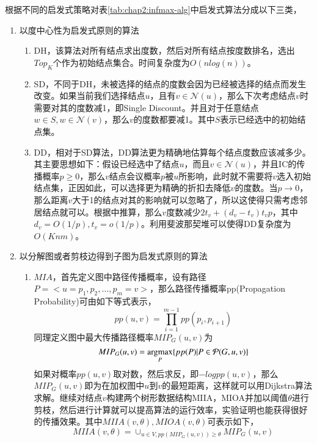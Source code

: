 根据不同的启发式策略对表\ref{tab:chap2:infmax-alg}中启发式算法分成以下三类，
\begin{enumerate}
\item 以度中心性为启发式原则的算法
\begin{enumerate}
\item DH\cite{hu2015rmdn}，该算法对所有结点求出度数，然后对所有结点按度数排名，选出$Top_{K}$个作为初始结点集合。时间复杂度为$O(nlog(n))$。
\item SD\cite{chen2009efficient}，不同于DH，未被选择的结点的度数会因为已经被选择的结点而发生改变。如果当前我们选择结点$u$，且有$v \in \mathcal{N}(u)$，那么下次考虑结点$v$时需要对其的度数减1，即Single Discount。并且对于任意结点$w \in S, w \in \mathcal{N}(v)$，那么$v$的度数都要减1。其中$S$表示已经选中的初始结点集。
\item DD\cite{chen2009efficient}，相对于SD算法，DD算法更为精确地估算每个结点度数应该减多少。其主要思想如下：假设已经选中了结点$u$，而且$v \in \mathcal{N}(u)$，并且IC的传播概率$p \geq 0$，那么$v$结点会议概率$p$被$u$所影响，此时就不需要将$v$选入初始结点集，正因如此，可以选择更为精确的折扣去降低$v$的度数。当$p \to 0$，那么距离$v$大于1的结点对其的影响就可以忽略了，所以这使得只需考虑邻居结点就可以。根据\cite{chen2009efficient}中推算，那么$v$度数减少$2t_{v} + (d_{v}-t_{v})t_{v}p$，其中$d_{v}=O(1/p), t_{v}=o(1/p)$。利用斐波那契堆可以使得DD复杂度为$O(Knm)$。
\end{enumerate}
\item 以分解图或者剪枝边得到子图为启发式原则的算法
\begin{enumerate}
\item $MIA$\cite{chen2010scalableKDD}，首先定义图中路径传播概率，设有路径$P=<u=p_{1},p_{2},\dots,p_{m}=v>$，那么路径传播概率pp(Propagation Probability)可由如下等式表示，
\begin{displaymath}pp(u,v)=\prod_{i=1}^{m-1}pp(p_{i}, p_{i+1})\end{displaymath}同理定义图中最大传播路径概率$MIP_{G}(u,v)$为
\begin{displaymath}MIP_{G}(u,v)=\mathop{\rm argmax} \limits_{P}\{pp(P)|P \in \mathcal{P}(G, u, v)\}\end{displaymath}如果对概率$pp(u,v)$取对数，然后求反，即$-logpp(u,v)$，那么$MIP_{G}(u,v)$即为在加权图中$u$到$v$的最短距离，这样就可以用Dijkstra算法求解。继续对结点$v$构建两个树形数据结构MIIA，MIOA并加以阈值$\theta$进行剪枝，然后进行计算就可以提高算法的运行效率，实验证明也能获得很好的传播效果。其中$MIIA(v, \theta),MIOA(v, \theta)$可表示如下，
\begin{displaymath}
MIIA(v, \theta)=\cup_{u \in V,pp(MIP_{G}(u, v)) \geq \theta}MIP_{G}(u,v)

\end{displaymath}
\end{enumerate}
\end{enumerate}
